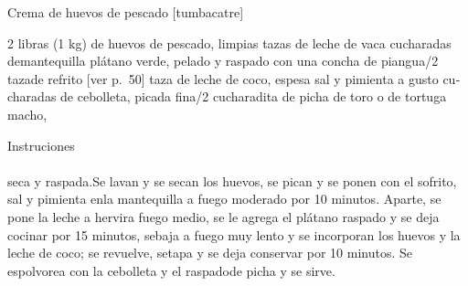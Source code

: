 \documentclass{article}
\begin{document}
  {\noindent \huge Crema de huevos de pescado {[}tumbacatre{]}}
  \vspace{1cm}

  \begin{multicols}{2}
  \noindent \color{light}
      2 libras (1 kg) de huevos de pescado, limpias tazas de leche de vaca cucharadas demantequilla plátano verde, pelado y ras­pado con una concha de piangua/2 tazade refrito {[}ver p.~50{]} taza de leche de coco, espesa\newline
      sal y pimienta a gusto cu­charadas de cebolleta, picada fina/2 cucharadita de picha de toro o de tortuga macho,\newline
    \end{multicols}
  \vspace{1cm}

  {\noindent \LARGE Instruciones}\\
  \\
  \noindent \color{light} seca y raspada.Se lavan y se secan los huevos, se pican y se ponen con
el sofrito, sal y pimienta enla mantequilla a fuego moderado por 10
minutos. Aparte, se pone la leche a hervira fuego medio, se le agrega el
plátano raspado y se deja cocinar por 15 minutos, sebaja a fuego muy
lento y se incorporan los huevos y la leche de coco; se re­vuelve,
setapa y se deja conservar por 10 minutos. Se espolvorea con la
cebolleta y el raspadode picha y se sirve.
\end{document}
